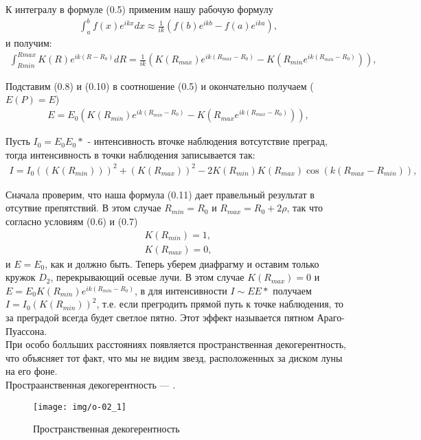К интегралу в формуле (0.5)
применим нашу рабочую формулу
\begin{gather}
\int_{a}^{b} f(x)e^{ikx}dx \approx \frac{1}{ik} (f(b)e^{ikb} - f(a)e^{ika}) ,
\end{gather}
и получим:
\begin{gather}
\int_{R{min}}^{R{max}} K(R)e^{ik(R-R_0)}dR = \frac{1}{ik}(K(R_{max})e^{ik(R_{max} - R_0)}-K(R_{min}e^{ik(R_{min} - R_0)})) ,
\end{gather}

Подставим (0.8) и (0.10)
в соотношение (0.5)
и окончательно получаем ($E(P)=E$)\\
\begin{gather}
E = E_0 (K(R_{min})e^{ik(R_{min} - R_0)}-K(R_{max}e^{ik(R_{max} - R_0)})) ,
\end{gather}

Пусть $I_0 = E_0 E_0*$ - интенсивность вточке наблюдения вотсутствие преград, тогда интенсивность в точки наблюдения записывается так:
\begin{gather}
I = I_0 ((K(R_{min})))^2 +(K(R_{max}))^2 - 2K(R_{min})K(R_{max})\cos(k(R_{max}-R_{min})) ,
\end{gather}

Сначала проверим, что наша формула (0.11)
дает правельный результат в отсутвие препятствий. В этом случае $R_{min} = R_0$ и $R_{max} = R_0 + 2\rho$, так что согласно условиям (0.6) и (0.7)
\begin{gather}
K(R_{min}) = 1 ,\\
K(R_{max}) = 0 ,
\end{gather}
и $E = E_0$, как и должно быть.
Теперь уберем диафрагму и оставим только кружок $D_2$, перекрывающий осевые лучи. В этом случае $K(R_{max}) = 0$ и $E=E_0 K(R_{min})e^{ik(R_{min}-R_0)}$, в для интенсивности $I \sim EE*$ получаем $I = I_0 (K(R_{min}))^2$, т.е. если прегродить прямой путь к точке наблюдения, то за преградой всегда будет светлое пятно. Этот эффект называется пятном Араго-Пуассона.\\

При особо болльших расстояниях появляется пространственная декогерентность, что объясняет тот факт, что мы не видим звезд, расположенных за диском луны на его фоне.\\

Простраанственная декогерентность — .\\
\begin{wrapfigure}[6]{R}{0.4\linewidth}
	\texttt{[image: img/o-02\_1]}{}
	\caption{Пространственная декогерентность}
	\label{o-02-prostra}
\end{wrapfigure}
